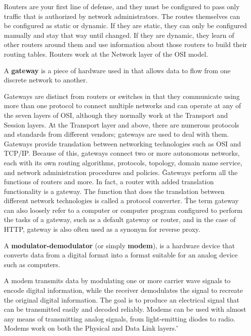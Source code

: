 Routers are your first line of defense, and they must be configured to pass only traffic that is authorized by
network administrators. The routes themselves can be configured as static or dynamic. If they are static, they can
only be configured manually and stay that way until changed. If they are dynamic, they learn of other routers around
them and use information about those routers to build their routing tables. Routers work at the Network layer of the
OSI model.

\bd[Gateway]
A \textbf{gateway} is a piece of hardware used in that allows data to flow from one discrete network to another.
\ed


Gateways are distinct from routers or switches in that they communicate using more than one protocol to connect
multiple networks and can operate at any of the seven layers of OSI, although they normally work at the Transport and
Session layers. At the Transport layer and above, there are numerous protocols and standards from different vendors;
gateways are used to deal with them. Gateways provide translation between networking technologies such as OSI and
TCP/IP. Because of this, gateways connect two or more autonomous networks, each with its own routing algorithms,
protocols, topology, domain name service, and network administration procedures and policies. \v

Gateways perform all the functions of routers and more. In fact, a router with added translation functionality is a
gateway. The function that does the translation between different network technologies is called a protocol converter. \v

The term gateway can also loosely refer to a computer or computer program configured to perform the tasks of a
gateway, such as a default gateway or router, and in the case of HTTP, gateway is also often used as a synonym for
reverse proxy.

\bd[Modem]
A \textbf{modulator-demodulator} (or simply \textbf{modem}), is a hardware device that converts data from a digital
format into a format suitable for an analog device such as computers.
\ed


A modem transmits data by modulating one or more carrier wave signals to encode digital information, while the
receiver demodulates the signal to recreate the original digital information. The goal is to produce an electrical
signal that can be transmitted easily and decoded reliably. Modems can be used with almost any means of transmitting
analog signals, from light-emitting diodes to radio. Modems work on both the Physical and Data Link layers. \v

